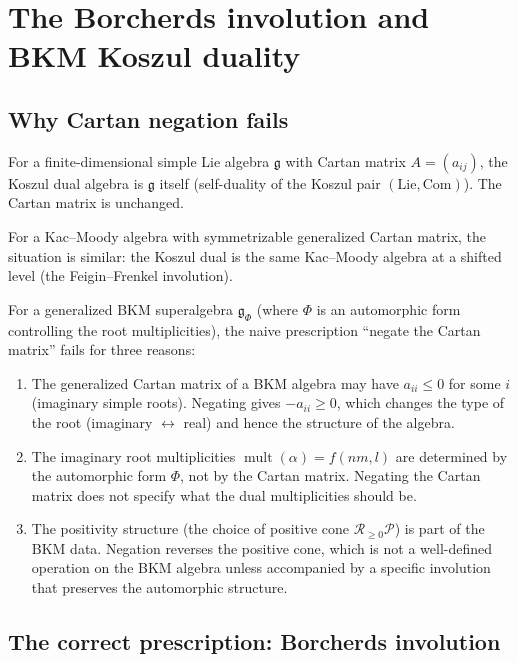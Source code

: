 \documentclass[11pt]{article}
\theoremstyle{definition}
\theoremstyle{remark}
\DeclareMathOperator{\mult}{mult}
\newcommand{\fkg}{\mathfrak{g}}
\newcommand{\cR}{\mathcal{R}}
\begin{document}
\section{The Borcherds involution and BKM Koszul duality}
\label{sec:borcherds}

\subsection{Why Cartan negation fails}

For a finite-dimensional simple Lie algebra $\fkg$ with Cartan matrix
$A = (a_{ij})$, the Koszul dual algebra is $\fkg$ itself (self-duality
of the Koszul pair $(\mathrm{Lie}, \mathrm{Com})$). The Cartan matrix
is unchanged.

For a Kac--Moody algebra with symmetrizable generalized Cartan matrix,
the situation is similar: the Koszul dual is the same Kac--Moody
algebra at a shifted level (the Feigin--Frenkel involution).

For a generalized BKM superalgebra $\fkg_\Phi$ (where $\Phi$ is an
automorphic form controlling the root multiplicities), the naive
prescription ``negate the Cartan matrix'' fails for three reasons:

\begin{enumerate}[label=(\arabic*)]
\item The generalized Cartan matrix of a BKM algebra may have
$a_{ii} \leq 0$ for some $i$ (imaginary simple roots). Negating
gives $-a_{ii} \geq 0$, which changes the type of the root
(imaginary $\leftrightarrow$ real) and hence the structure of the
algebra.

\item The imaginary root multiplicities $\mult(\alpha) = f(nm, l)$
are determined by the automorphic form $\Phi$, not by the Cartan
matrix. Negating the Cartan matrix does not specify what the dual
multiplicities should be.

\item The positivity structure (the choice of positive cone
$\cR_{\geq 0} \mathcal{P}$) is part of the BKM data. Negation
reverses the positive cone, which is not a well-defined operation
on the BKM algebra unless accompanied by a specific involution that
preserves the automorphic structure.
\end{enumerate}

\subsection{The correct prescription: Borcherds involution}
\end{document}
